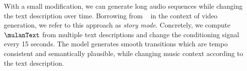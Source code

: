 With a small modification, we can generate long audio sequences while changing the text description over time. Borrowing from ~\citet{phenaki} in the context of video generation, we refer to this approach as \emph{story mode}. Concretely, we compute $\mulanText$ from multiple text descriptions and change the conditioning signal every 15 seconds. The model generates smooth transitions which are tempo consistent and semantically plausible, while changing music context according to the text description.
